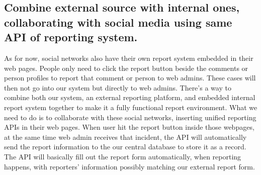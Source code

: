 \subsection{Combine external source with internal ones, collaborating with social media using same API of reporting system.}
As for now, social networks also have their own report system embedded in their web pages. People only need to click the report button beside the comments or person profiles to report that comment or person to web admins. These cases will then not go into our system but directly to web admins. There’s a way to combine both our system, an external reporting platform, and embedded internal report system together to make it a fully functional report environment. What we need to do is to collaborate with these social networks, inserting unified reporting APIs in their web pages. When user hit the report button inside those webpages, at the same time web admin receives that incident, the API will automatically send the report information to the our central database to store it as a record. The API will basically fill out the report form automatically, when reporting happens, with reporters’ information possibly matching our external report form.  

